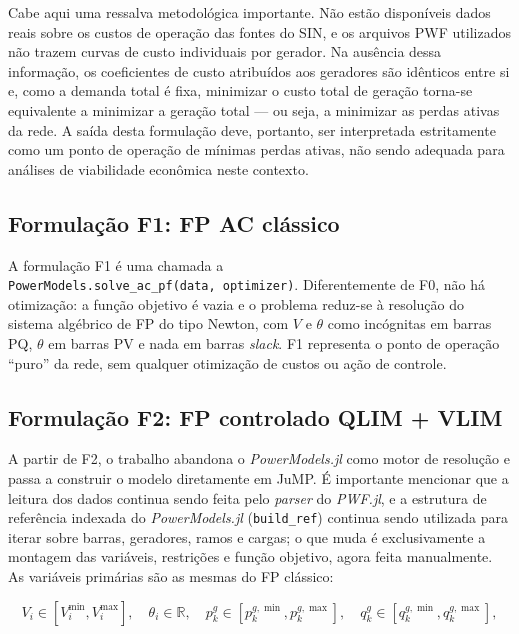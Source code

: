 Cabe aqui uma ressalva metodológica importante. Não estão disponíveis dados reais sobre os custos de operação das fontes do SIN, e os arquivos PWF utilizados não trazem curvas de custo individuais por gerador. Na ausência dessa informação, os coeficientes de custo atribuídos aos geradores são idênticos entre si e, como a demanda total é fixa, minimizar o custo total de geração torna-se equivalente a minimizar a geração total --- ou seja, a minimizar as perdas ativas da rede. A saída desta formulação deve, portanto, ser interpretada estritamente como um ponto de operação de mínimas perdas ativas, não sendo adequada para análises de viabilidade econômica neste contexto.

\subsection{Formulação F1: FP AC clássico}
\label{subsec:f15}

A formulação F1 é uma chamada a \texttt{PowerModels.\allowbreak solve\_ac\_pf(data,\allowbreak\ optimizer)}. Diferentemente de F0, não há otimização: a função objetivo é vazia e o problema reduz-se à resolução do sistema algébrico de FP do tipo Newton, com $V$ e $\theta$ como incógnitas em barras PQ, $\theta$ em barras PV e nada em barras \textit{slack}. F1 representa o ponto de operação ``puro'' da rede, sem qualquer otimização de custos ou ação de controle.

\subsection{Formulação F2: FP controlado QLIM + VLIM}
\label{subsec:f16}

A partir de F2, o trabalho abandona o \textit{PowerModels.jl} como motor de resolução e passa a construir o modelo diretamente em JuMP. É importante mencionar que a leitura dos dados continua sendo feita pelo \textit{parser} do \textit{PWF.jl}, e a estrutura de referência indexada do \textit{PowerModels.jl} (\texttt{build\_ref}) continua sendo utilizada para iterar sobre barras, geradores, ramos e cargas; o que muda é exclusivamente a montagem das variáveis, restrições e função objetivo, agora feita manualmente. As variáveis primárias são as mesmas do FP clássico:

\begin{equation}
\label{eq:vars-base}
V_i \in [V^{\min}_i, V^{\max}_i], \quad \theta_i \in \mathbb{R}, \quad p^g_k \in [p^{g,\min}_k, p^{g,\max}_k], \quad q^g_k \in [q^{g,\min}_k, q^{g,\max}_k],
\end{equation}

